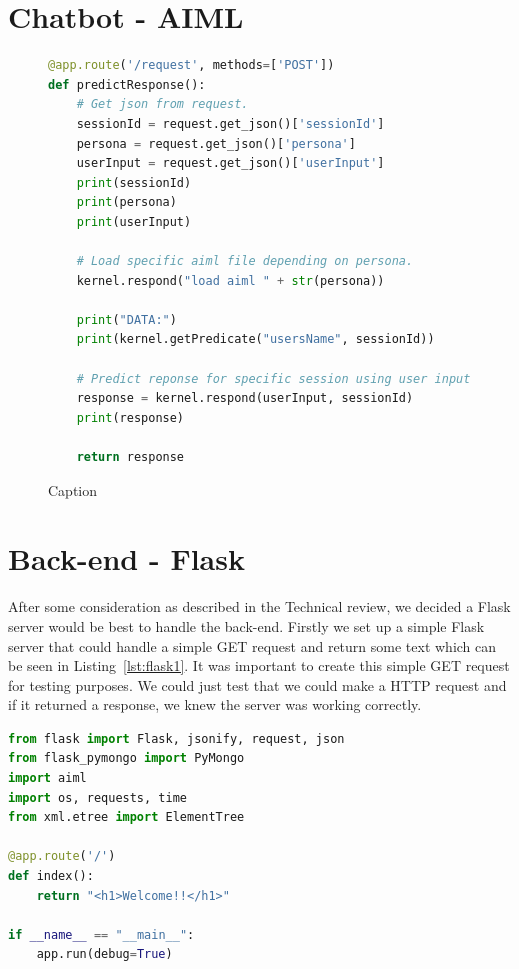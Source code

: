 \section{Chatbot - AIML}
\begin{figure}[!h]
    \centering
    \begin{lstlisting}[language=PYTHON]
@app.route('/request', methods=['POST'])
def predictResponse():
    # Get json from request.
    sessionId = request.get_json()['sessionId']
    persona = request.get_json()['persona']
    userInput = request.get_json()['userInput']
    print(sessionId)
    print(persona)
    print(userInput)

    # Load specific aiml file depending on persona.
    kernel.respond("load aiml " + str(persona))

    print("DATA:")
    print(kernel.getPredicate("usersName", sessionId))

    # Predict reponse for specific session using user input.
    response = kernel.respond(userInput, sessionId)
    print(response)

    return response

\end{lstlisting}
    \caption{Caption}
    \label{fig:my_label}
\end{figure}

\section{Back-end - Flask}
After some consideration as described in the Technical review, we decided a Flask server would be best to handle the back-end. Firstly we set up a simple Flask server that could handle a simple GET request and return some text which can be seen in Listing~\ref{lst:flask1}. It was important to create this simple GET request for testing purposes. We could just test that we could make a HTTP request and if it returned a response, we knew the server was working correctly.\newline


\begin{lstlisting}[caption={Basic Flask GET request},label={lst:flask1},language=python]
from flask import Flask, jsonify, request, json
from flask_pymongo import PyMongo
import aiml
import os, requests, time
from xml.etree import ElementTree

@app.route('/')
def index():
    return "<h1>Welcome!!</h1>"
    
if __name__ == "__main__":
    app.run(debug=True)
\end{lstlisting}

